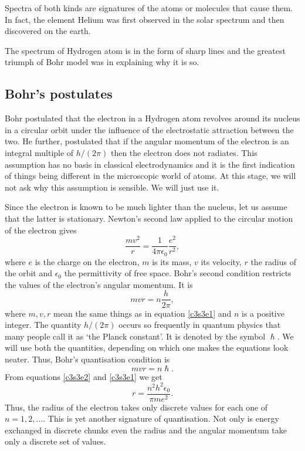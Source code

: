 Spectra of both kinds are signatures of the atoms or molecules that cause them.
In fact, the element Helium was first observed in the solar spectrum and then 
discovered on the earth.

The spectrum of Hydrogen atom is in the form of sharp lines and the greatest
triumph of Bohr model was in explaining why it is so.

\subsection{Bohr's postulates}
Bohr postulated \cite{bohr1913constitution} that the electron in a Hydrogen 
atom  revolves around its nucleus in a circular orbit under the influence of 
the electrostatic attraction between the two. He further, postulated that if the
angular momentum of the electron is an integral multiple of $h/(2\pi)$ then
the electron does not radiates. This assumption has no basis in classical
electrodynamics and it is the first indication of things being different in the
microscopic world of atoms. At this stage, we will not ask why this assumption
is sensible. We will just use it.

Since the electron is known to be much lighter than the nucleus, let us assume
that the latter is stationary. Newton's second law applied to the circular 
motion of the electron gives
\begin{equation}\label{c3s3e1}
\frac{mv^2}{r} = \frac{1}{4\pi\epsilon_0}\frac{e^2}{r^2},
\end{equation}
where $e$ is the charge on the electron, $m$ is its mass, $v$ its velocity, $r$
the radius of the orbit and $\epsilon_0$ the permittivity of free space. Bohr's
second condition restricts the values of the electron's angular momentum. It is
\begin{equation}\label{c3s3e2}
mvr = n\frac{h}{2\pi},
\end{equation}
where $m, v, r$ mean the same things as in equation \eqref{c3s3e1} and $n$ is a
positive integer. The quantity $h/(2\pi)$ occurs so frequently in quantum physics
that many people call it as `the Planck constant'. It is denoted by the symbol
$\hslash$. We will use both the quantities, depending on which one makes the 
equations look neater. Thus, Bohr's quantisation condition
is
\begin{equation}\label{c3s3e3}
mvr = n\hslash.
\end{equation}
From equations \eqref{c3s3e2} and \eqref{c3s3e1} we get
\begin{equation}\label{c3s3e4}
r = \frac{n^2 h^2 \epsilon_0}{\pi me^2}.
\end{equation}
Thus, the radius of the electron takes only discrete values for each one of $n =
1, 2, \ldots$. This is yet another signature of quantisation. Not only is energy
exchanged in discrete chunks even the radius and the angular momentum take only
a discrete set of values.

